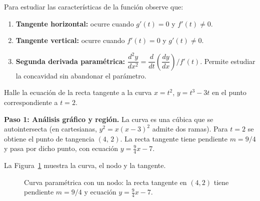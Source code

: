 \begin{rem} Para estudiar las características de la función observe que:
\begin{enumerate}
  \item \textbf{Tangente horizontal:} ocurre cuando $g'(t) = 0$ y $f'(t) \neq 0$.
  \item \textbf{Tangente vertical:} ocurre cuando $f'(t) = 0$ y $g'(t) \neq 0$.
  \item \textbf{Segunda derivada paramétrica:}
    $\dfrac{d^2y}{dx^2} = \dfrac{d}{dt}\!\left(\dfrac{dy}{dx}\right)\Big/f'(t)$.
    Permite estudiar la concavidad sin abandonar el parámetro.
\end{enumerate} 
\end{rem}

\begin{example}
Halle la ecuación de la recta tangente a la curva $x = t^2$, $y = t^3 - 3t$
en el punto correspondiente a $t = 2$.
 
\begin{myproof}
 
\textbf{Paso 1: Análisis gráfico y región.}
La curva es una cúbica que se autointersecta (en cartesianas, $y^2 = x(x-3)^2$
admite dos ramas). Para $t = 2$ se obtiene el punto de tangencia $(4,\,2)$.
La recta tangente tiene pendiente $m = 9/4$ y pasa por dicho punto,
con ecuación $y = \tfrac{9}{4}x - 7$.
 
La Figura~\ref{fig:param_tangente_nodo} muestra la curva, el nodo y la tangente.

\begin{figure}[H]
\centering
{}
\caption{Curva paramétrica con un nodo: la recta tangente en $(4,2)$ tiene pendiente $m=9/4$ y ecuación $y=\tfrac{9}{4}x-7$.}
\label{fig:param_tangente_nodo}
\end{figure}
 

\end{myproof}
\end{example}
